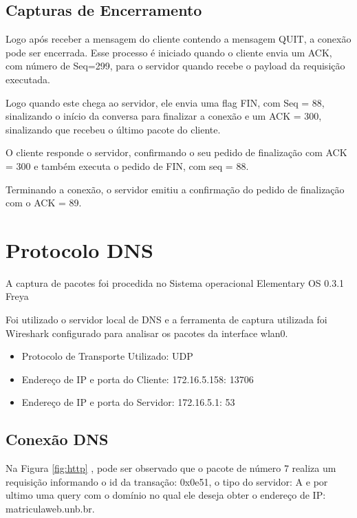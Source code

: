 \subsection{Capturas de Encerramento}
Logo após receber a mensagem do cliente  contendo a mensagem QUIT, a conexão pode ser encerrada.
 Esse processo é iniciado quando o cliente envia um ACK, com número de Seq=299, para o servidor
  quando recebe o payload da requisição executada.

Logo quando este chega ao servidor, ele envia uma flag FIN, com Seq = 88, sinalizando o início
 da conversa para finalizar a conexão e um ACK = 300, sinalizando que recebeu o último
  pacote do cliente.

O cliente responde o servidor, confirmando o seu pedido de finalização com ACK = 300 e
também executa o pedido de FIN, com seq = 88.

Terminando a conexão, o servidor emitiu a confirmação do pedido de finalização com o ACK = 89.

\section{Protocolo DNS}

A captura de pacotes foi procedida no Sistema operacional Elementary OS 0.3.1 Freya

Foi utilizado o servidor local de DNS e a ferramenta de captura utilizada foi Wireshark  configurado para analisar os pacotes da interface wlan0.

\begin{itemize}

    \item Protocolo de Transporte Utilizado: UDP

    \item Endereço de IP e porta do Cliente: 172.16.5.158: 13706 

    \item Endereço de IP e porta do Servidor: 172.16.5.1: 53

\end{itemize}

\subsection{Conexão DNS}
Na Figura \ref{fig:http} , pode ser observado que o pacote de número 7 realiza um requisição informando o id da transação: 0x0e51, o tipo do servidor: A e por ultimo uma query com o domínio no qual ele deseja obter o endereço de IP: matriculaweb.unb.br. 


